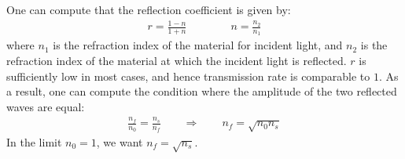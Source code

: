 \documentclass[11pt]{book}
\theoremstyle{break}
\theoremstyle{break}
\begin{document}
One can compute that the reflection coefficient is given by:
\begin{align*}
r = \frac{1-n}{1+n} \qquad\qquad n=\frac{n_2}{n_1}
\end{align*}
where $n_1$ is the refraction index of the material for incident light, and $n_2$ is the refraction index of the material at which the incident light is reflected. $r$ is sufficiently low in most cases, and hence transmission rate is comparable to $1$. As a result, one can compute the condition where the amplitude of the two reflected waves are equal:
\begin{align*}
\frac{n_f}{n_0} = \frac{n_s}{n_f} \qquad \Rightarrow \qquad n_f =\sqrt{n_0 n_s}
\end{align*}
In the limit $n_0 = 1$, we want $n_f = \sqrt{n_s}$. \\
\end{document}
